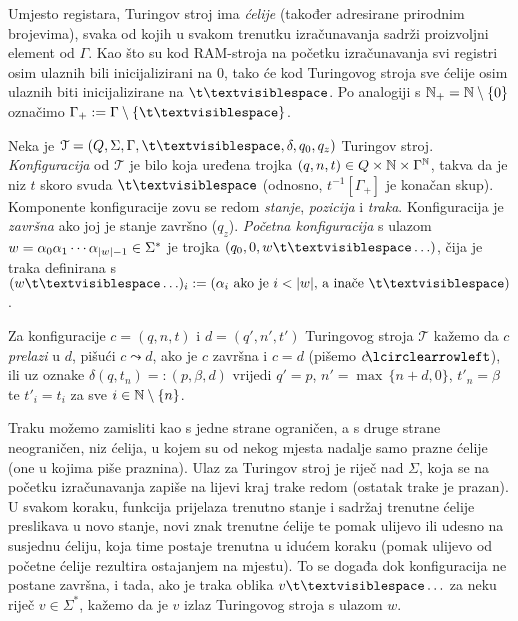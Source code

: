 Umjesto registara, Turingov stroj ima \emph{ćelije} (također adresirane prirodnim brojevima), svaka od kojih u svakom trenutku izračunavanja sadrži proizvoljni element od $\Gamma$. Kao što su kod RAM-stroja na početku izračunavanja svi registri osim ulaznih bili inicijalizirani na $0$, tako će kod Turingovog stroja sve ćelije osim ulaznih biti inicijalizirane na $\bl$. Po analogiji s ${\mathbb N}_+={\mathbb N}\setminus\{0\}$ označimo $\Gamma_+:=\Gamma\setminus\{\bl\}$.

\begin{definicija}[{name=[Turing-konfiguracije i prijelazi među njima]}]
	Neka je $\mathcal T=(Q,\Sigma,\Gamma,\bl,\delta,q_0,q_z)$ Turingov stroj. \emph{Konfiguracija} od $\mathcal T$ je bilo koja uređena trojka $(q,n,t)\in Q\times{\mathbb N}\times\Gamma^{\mathbb N}$, takva da je niz $t$ skoro svuda $\bl$ (odnosno, $t^{-1}[\Gamma_+]$ je konačan skup). Komponente konfiguracije zovu se redom \emph{stanje}, \emph{pozicija} i \emph{traka}. Konfiguracija je \emph{završna} ako joj je stanje završno ($q_z$). \emph{Početna konfiguracija} s ulazom $w=\alpha_0\alpha_1\dotsm\alpha_{\lvert w\rvert-1}\in\Sigma^*$ je trojka $(q_0,0,w\bl\ldots)$, čija je traka definirana s $(w\bl\ldots)_i:=(\text{$\alpha_i$ ako je $i<\dulj w$, a inače $\bl$})$.%

	Za konfiguracije $c=(q,n,t)$ i $d=(q',n',t')$ Turingovog stroja $\mathcal T$ kažemo da $c$ \emph{prelazi} u $d$, pišući $c\leadsto d$, ako je $c$ završna i $c=d$ (pišemo $c\!\lcirclearrowleft$), ili uz oznake $\delta(q,t_n)=:(p,\beta,d)$ vrijedi $q'=p$, $n'=\max\,\{n+d,0\}$, $t'_n=\beta$ te $t'_i=t_i$ za sve $i\in{\mathbb N}\setminus\{n\}$.
\end{definicija}

Traku možemo zamisliti kao s jedne strane ograničen, a s druge strane neograničen, niz ćelija, u kojem su od nekog mjesta nadalje samo prazne ćelije (one u kojima piše praznina). Ulaz za Turingov stroj je riječ nad $\Sigma$, koja se na početku izračunavanja zapiše na lijevi kraj trake redom (ostatak trake je prazan). U svakom koraku, funkcija prijelaza trenutno stanje i sadržaj trenutne ćelije preslikava u novo stanje, novi znak trenutne ćelije te pomak ulijevo ili udesno na susjednu ćeliju, koja time postaje trenutna u idućem koraku (pomak ulijevo od početne ćelije rezultira ostajanjem na mjestu). To se događa dok konfiguracija ne postane završna, i tada, ako je traka oblika $v\bl\ldots$ za neku riječ $v\in\Sigma^*$, kažemo da je $v$ izlaz Turingovog stroja s ulazom $w$.

